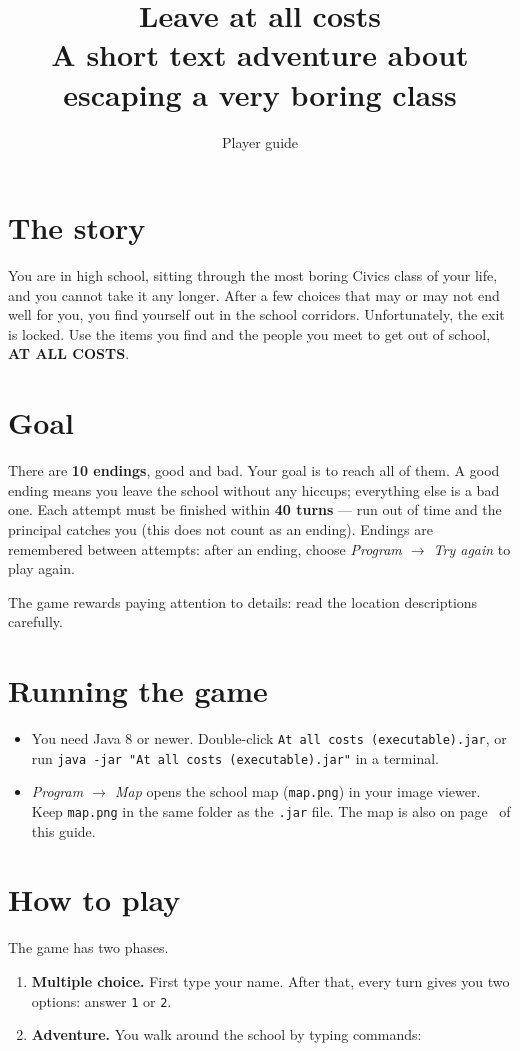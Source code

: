 \documentclass[11pt, a4paper]{article}
\title{\textbf{Leave at all costs}\\[2pt]\large A short text adventure about escaping a very boring class}
\author{Player guide}
\date{}
\newcommand{\cmd}[1]{\texttt{#1}}
\begin{document}
\maketitle
\thispagestyle{empty}

\section*{The story}
You are in high school, sitting through the most boring Civics class of your life, and you
cannot take it any longer. After a few choices that may or may not end well for you, you find
yourself out in the school corridors. Unfortunately, the exit is locked. Use the items you find
and the people you meet to get out of school, \textcolor{alarm}{\textbf{AT ALL COSTS}}.

\section*{Goal}
There are \textbf{10 endings}, good and bad. Your goal is to reach all of them. A good ending
means you leave the school without any hiccups; everything else is a bad one. Each attempt
must be finished within \textbf{40 turns} --- run out of time and the principal catches you
(this does not count as an ending). Endings are remembered between attempts: after an
ending, choose \emph{Program $\to$ Try again} to play again.

The game rewards paying attention to details: read the location descriptions carefully.

\section*{Running the game}
\begin{itemize}
  \item You need Java 8 or newer. Double-click \texttt{At all costs (executable).jar}, or run
        \texttt{java -jar "At all costs (executable).jar"} in a terminal.
  \item \emph{Program $\to$ Map} opens the school map (\texttt{map.png}) in your image viewer.
        Keep \texttt{map.png} in the same folder as the \texttt{.jar} file.
        The map is also on page~\pageref{sec:map} of this guide.
\end{itemize}

\section*{How to play}
The game has two phases.
\begin{enumerate}
  \item \textbf{Multiple choice.} First type your name. After that, every turn gives you two
        options: answer \cmd{1} or \cmd{2}.
  \item \textbf{Adventure.} You walk around the school by typing commands:
\end{enumerate}
\end{document}
